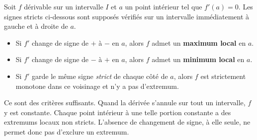 


\begin{nxprop}
Soit $f$ dérivable sur un intervalle $I$ et $a$ un point intérieur tel que
$f'(a)=0$. Les signes stricts ci-dessous sont supposés vérifiés sur un
intervalle immédiatement à gauche et à droite de $a$.

\begin{itemize}
  \item Si $f'$ change de signe de $+$ à $-$ en $a$, alors $f$ admet un
        \textbf{maximum local} en $a$.
  \item Si $f'$ change de signe de $-$ à $+$ en $a$, alors $f$ admet un
        \textbf{minimum local} en $a$.
  \item Si $f'$ garde le même signe \emph{strict} de chaque côté de $a$,
        alors $f$ est strictement monotone dans ce voisinage et n'y a pas d'extremum.
\end{itemize}
Ce sont des critères suffisants. Quand la dérivée s'annule sur tout un
intervalle, $f$ y est constante. Chaque point intérieur à une telle portion
constante a des extremums locaux non stricts.
L'absence de changement de signe, à elle seule, ne permet donc pas d'exclure un extremum.
\end{nxprop}



